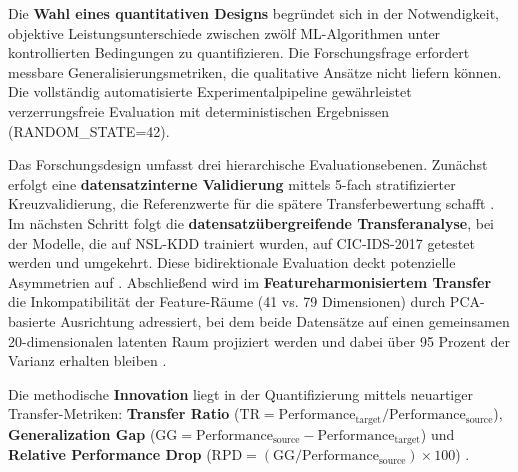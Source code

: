 \documentclass[11pt,a4paper]{article}
\begin{document}
    Die \textbf{Wahl eines quantitativen Designs} begründet sich in der Notwendigkeit, objektive Leistungsunterschiede zwischen zwölf ML-Algorithmen unter kontrollierten Bedingungen zu quantifizieren. Die Forschungsfrage erfordert messbare Generalisierungsmetriken, die qualitative Ansätze nicht liefern können. Die vollständig automatisierte Experimentalpipeline gewährleistet verzerrungsfreie Evaluation mit deterministischen Ergebnissen (RANDOM\_STATE=42).

    Das Forschungsdesign umfasst drei hierarchische Evaluationsebenen. Zunächst erfolgt eine \textbf{datensatzinterne Validierung} mittels 5-fach stratifizierter Kreuzvalidierung, die Referenzwerte für die spätere Transferbewertung schafft \parencite{Tavallaee2009}. Im nächsten Schritt folgt die \textbf{datensatzübergreifende Transferanalyse}, bei der Modelle, die auf NSL-KDD trainiert wurden, auf CIC-IDS-2017 getestet werden und umgekehrt. Diese bidirektionale Evaluation deckt potenzielle Asymmetrien auf \parencite{Ring2019}. Abschließend wird im \textbf{Featureharmonisiertem Transfer} die Inkompatibilität der Feature-Räume (41 vs. 79 Dimensionen) durch PCA-basierte Ausrichtung adressiert, bei dem beide Datensätze auf einen gemeinsamen 20-dimensionalen latenten Raum projiziert werden und dabei über 95 Prozent der Varianz erhalten bleiben \parencite{Goodfellow2016}.

    Die methodische \textbf{Innovation} liegt in der Quantifizierung mittels neuartiger Transfer-Metriken: \textbf{Transfer Ratio} ($\text{TR} = \text{Performance}_{\text{target}} / \text{Performance}_{\text{source}}$), \textbf{Generalization Gap} ($\text{GG} = \text{Performance}_{\text{source}} - \text{Performance}_{\text{target}}$) und \textbf{Relative Performance Drop} ($\text{RPD} = (\text{GG} / \text{Performance}_{\text{source}}) \times 100$) \parencite{Mourouzis2021}.
\end{document}
